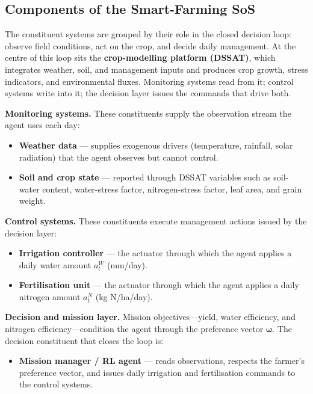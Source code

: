 \subsection{Components of the Smart-Farming SoS}

The constituent systems are grouped by their role in the closed decision loop:
observe field conditions, act on the crop, and decide daily management. At the
centre of this loop sits the \textbf{crop-modelling platform (DSSAT)}, which
integrates weather, soil, and management inputs and produces crop growth, stress
indicators, and environmental fluxes. Monitoring systems read from it; control
systems write into it; the decision layer issues the commands that drive both.

\vspace{0.25cm}
\noindent\textbf{Monitoring systems.}
These constituents supply the observation stream the agent uses each day:
\begin{itemize}
  \item \textbf{Weather data} --- supplies exogenous drivers (temperature,
        rainfall, solar radiation) that the agent observes but cannot control.
  \item \textbf{Soil and crop state} --- reported through DSSAT variables such
        as soil-water content, water-stress factor, nitrogen-stress factor,
        leaf area, and grain weight.
\end{itemize}

\vspace{0.25cm}
\noindent\textbf{Control systems.}
These constituents execute management actions issued by the decision layer:
\begin{itemize}
  \item \textbf{Irrigation controller} --- the actuator through which the agent
        applies a daily water amount $a_t^{W}$ (mm/day).
  \item \textbf{Fertilisation unit} --- the actuator through which the agent
        applies a daily nitrogen amount $a_t^{N}$ (kg N/ha/day).
\end{itemize}

\vspace{0.25cm}
\noindent\textbf{Decision and mission layer.}
Mission objectives---yield, water efficiency, and nitrogen efficiency---condition
the agent through the preference vector $\boldsymbol{\omega}$. The decision
constituent that closes the loop is:
\begin{itemize}
  \item \textbf{Mission manager / RL agent} --- reads observations, respects the
        farmer's preference vector, and issues daily irrigation and fertilisation
        commands to the control systems.
\end{itemize}

